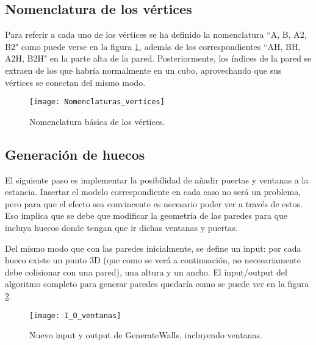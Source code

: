 \subsection{Nomenclatura de los vértices}
\label{nomenclatura_vertices}
Para referir a cada uno de los vértices se ha definido la nomenclatura ``A, B, A2, B2" como puede verse en la figura \ref{fig:nomenclatura_vertices}, además de los correspondientes ``AH, BH, A2H, B2H" en la parte alta de la pared. Posteriormente, los índices de la pared se extraen de los que habría normalmente en un cubo, aprovechando que sus vértices se conectan del mismo modo.

\begin{figure}[H]
    \centering
    \texttt{[image: Nomenclaturas\_vertices]}
    \caption{Nomenclatura básica de los vértices.}
    \label{fig:nomenclatura_vertices}
\end{figure}


\subsection{Generación de huecos}
\label{holes_design}
El siguiente paso es implementar la posibilidad de añadir puertas y ventanas a la estancia. Insertar el modelo correspondiente en cada caso no será un problema, pero para que el efecto sea convincente es necesario poder ver a través de estos. Eso implica que se debe que modificar la geometría de las paredes para que incluya huecos donde tengan que ir dichas ventanas y puertas.

Del mismo modo que con las paredes inicialmente, se define un input: por cada hueco existe un punto 3D (que como se verá a continuación, no necesariamente debe colisionar con una pared), una altura y un ancho. El input/output del algoritmo completo para generar paredes quedaría como se puede ver en la figura \ref{fig:io_generatewindows}.

\begin{figure}[H]
    \centering
    \texttt{[image: I\_O\_ventanas]}
    \caption{Nuevo input y output de GenerateWalls, incluyendo ventanas.}
    \label{fig:io_generatewindows}
\end{figure}

